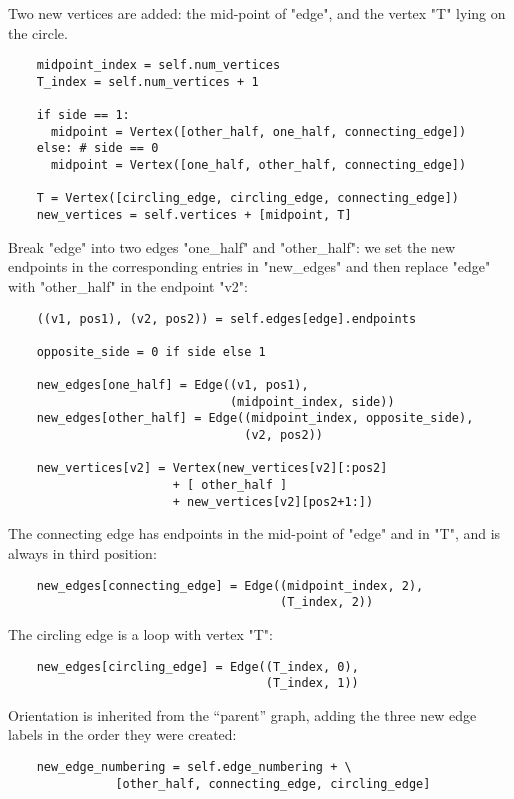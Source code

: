 Two new vertices are added: the mid-point of "edge", and
the vertex "T" lying on the circle.
\begin{lstlisting}
    midpoint_index = self.num_vertices
    T_index = self.num_vertices + 1

    if side == 1:
      midpoint = Vertex([other_half, one_half, connecting_edge])
    else: # side == 0
      midpoint = Vertex([one_half, other_half, connecting_edge])

    T = Vertex([circling_edge, circling_edge, connecting_edge])
    new_vertices = self.vertices + [midpoint, T]

\end{lstlisting}

Break "edge" into two edges "one_half" and "other_half": we set the
new endpoints in the corresponding entries in "new_edges" and then
replace "edge" with "other_half" in the endpoint "v2":
\begin{lstlisting}
    ((v1, pos1), (v2, pos2)) = self.edges[edge].endpoints

    opposite_side = 0 if side else 1

    new_edges[one_half] = Edge((v1, pos1), 
                               (midpoint_index, side))
    new_edges[other_half] = Edge((midpoint_index, opposite_side), 
                                 (v2, pos2))

    new_vertices[v2] = Vertex(new_vertices[v2][:pos2]
                       + [ other_half ]
                       + new_vertices[v2][pos2+1:])

\end{lstlisting}

The connecting edge has endpoints in the mid-point of
"edge" and in "T", and is always in third position:
\begin{lstlisting}
    new_edges[connecting_edge] = Edge((midpoint_index, 2), 
                                      (T_index, 2))

\end{lstlisting}

The circling edge is a loop with vertex "T":
\begin{lstlisting}
    new_edges[circling_edge] = Edge((T_index, 0), 
                                    (T_index, 1))

\end{lstlisting}

Orientation is inherited from the ``parent'' graph, adding the three
new edge labels in the order they were created:
\begin{lstlisting}
    new_edge_numbering = self.edge_numbering + \
               [other_half, connecting_edge, circling_edge]

\end{lstlisting}

